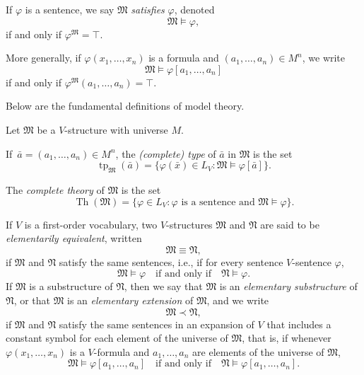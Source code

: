 \documentclass{scrartcl}
\DeclareMathOperator{\Th}{Th}
\DeclareMathOperator{\tp}{tp}
\renewcommand{\phi}{\varphi}
\newcommand{\FM}{\mathfrak{M}}
\newcommand{\FN}{\mathfrak{N}}
\begin{document}
\begin{notation}
If $\varphi$ is a sentence, we say $\mathfrak{M}$ \emph{satisfies} $\phi$, denoted
\[
\mathfrak{M}\models \varphi,
\]
if and only if $\varphi^{\mathfrak{M}}=\top$.

More generally, if $\phi(x_1,\dots, x_n)$ is a formula and $(a_1,\dots, a_n)\in M^n$, we write
\[
\mathfrak{M}\models \varphi[a_1,\dots,a_n]
\]
if and only if $\varphi^{\mathfrak{M}}(a_1,\dots,a_n)=\top$.
\end{notation}

Below are the fundamental definitions of model theory.

\begin{definition}
Let $\mathfrak{M}$ be a $V$-structure with universe $M$.

If $\bar a= (a_1,\dots, a_n)\in M^n$, the \emph{(complete) type} of $\bar a$ in $\mathfrak{M}$ is the set %
\[
\tp_{\mathfrak M}(\bar a)=
\{\varphi(\bar x)\in L_V \colon \mathfrak{M}\models\varphi[\bar a] \}.
\]

The \emph{complete theory} of $\mathfrak{M}$ is the set
\[ 
\Th(\mathfrak{M}) = \{ \varphi\in L_V \colon \varphi \text{ is a sentence and } \mathfrak{M}\models\varphi \}.
\]
\end{definition}


 

\begin{definition}
If $V$ is a first-order vocabulary, two $V$-structures $\mathfrak{M}$ and $\mathfrak{N}$ are said to be \emph{elementarily equivalent}, written
\[
\mathfrak{M}\equiv\mathfrak{N},
\]
if $\mathfrak{M}$ and $\mathfrak{N}$ satisfy the same sentences, i.e., if
for every sentence $V$-sentence $\varphi$,
\[
\mathfrak{M}\models \varphi
\quad\text{if and only if}\quad
\mathfrak{N} \models \varphi.
\]
If $\mathfrak{M}$ is a substructure of $\mathfrak{N}$, then we say that $\mathfrak{M}$ is an \emph{elementary substructure} of $\mathfrak{N}$, or that $\FM$ is an \emph{elementary extension} of $\FM$, and we write
\[
\mathfrak{M}\prec\mathfrak{N},
\]
if $\FM$ and $\FN$ satisfy the same sentences in an expansion of $V$ that includes a constant symbol for each element of the universe of $\mathfrak{M}$, that is, if whenever $\varphi(x_1,\dots, x_n)$ is a $V$-formula and $a_1,\dots, a_n$ are elements of the universe of $\mathfrak{M}$, 
\[
\mathfrak{M}\models \varphi[a_1,\dots, a_n]
\quad\text{if and only if}\quad
\mathfrak{N} \models \varphi[a_1,\dots, a_n].
\]
\end{definition}
\end{document}
